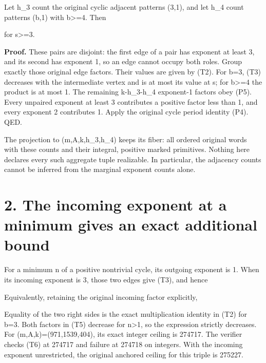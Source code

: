 Let h\_3 count the original cyclic adjacent patterns (3,1), and let h\_4
count patterns (b,1) with b\textgreater=4. Then


for s\textgreater=3.

\textbf{Proof.} These pairs are disjoint: the first edge of a pair has
exponent at least 3, and its second has exponent 1, so an edge cannot
occupy both roles. Group exactly those original edge factors. Their
values are given by (T2). For b=3, (T3) decreases with the intermediate
vertex and is at most its value at s; for b\textgreater=4 the product is
at most 1. The remaining k-h\_3-h\_4 exponent-1 factors obey (P5). Every
unpaired exponent at least 3 contributes a positive factor less than 1,
and every exponent 2 contributes 1. Apply the original cycle period
identity (P4). QED.

The projection to (m,A,k,h\_3,h\_4) keeps its fiber: all ordered
original words with these counts and their integral, positive marked
primitives. Nothing here declares every such aggregate tuple realizable.
In particular, the adjacency counts cannot be inferred from the marginal
exponent counts alone.

\section{2. The incoming exponent at a minimum gives an exact additional
bound}

For a minimum n of a positive nontrivial cycle, its outgoing exponent is
1. When its incoming exponent is 3, those two edges give (T3), and hence


Equivalently, retaining the original incoming factor explicitly,


Equality of the two right sides is the exact multiplication identity in
(T2) for b=3. Both factors in (T5) decrease for n\textgreater1, so the
expression strictly decreases. For (m,A,k)=(971,1539,404), its exact
integer ceiling is 274717. The verifier checks (T6) at 274717 and
failure at 274718 on integers. With the incoming exponent unrestricted,
the original anchored ceiling for this triple is 275227.

